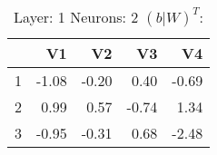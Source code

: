 \begin{table}[ht]
\centering
\begin{tabular}{rrrrr}
  \hline
 & V1 & V2 & V3 & V4 \\ 
  \hline
1 & -1.08 & -0.20 & 0.40 & -0.69 \\ 
  2 & 0.99 & 0.57 & -0.74 & 1.34 \\ 
  3 & -0.95 & -0.31 & 0.68 & -2.48 \\ 
   \hline
\end{tabular}
\caption{Layer: 1 Neurons: 2  $(b|W)^T$: 
} 
\end{table}
